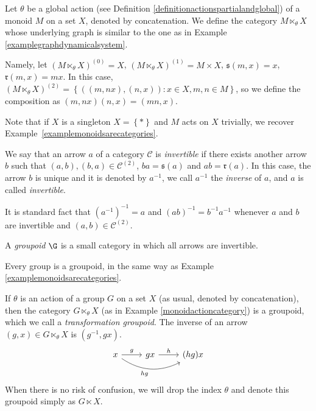 \begin{example}\label{monoidactioncategory}
Let $\theta$ be a global action (see Definition \ref{definitionactionspartialandglobal}) of a monoid $M$ on a set $X$, denoted by concatenation. We define the category $M\ltimes_\theta X$ whose underlying graph is similar to the one as in Example \ref{examplegraphdynamicalsystem}.

Namely, let $(M\ltimes_\theta X)^{(0)}=X$, $(M\ltimes_\theta X)^{(1)}=M\times X$, $\mathfrak{s}(m,x)=x$, $\mathfrak{r}(m,x)=mx$. In this case, $(M\ltimes_\theta X)^{(2)}=\left\{((m,nx),(n,x)):x\in X,m,n\in M\right\}$, so we define the composition as $(m,nx)(n,x)=(mn,x)$.

Note that if $X$ is a singleton $X=\left\{*\right\}$ and $M$ acts on $X$ trivially, we recover Example~\ref{examplemonoidsarecategories}.
\end{example}

We say that an arrow $a$ of a category $\mathcal{C}$ is \emph{invertible} if there exists another arrow $b$ such that $(a,b),(b,a)\in \mathcal{C}^{(2)}$, $ba=\mathfrak{s}(a)$ and $ab=\mathfrak{r}(a)$. In this case, the arrow $b$ is unique and it is denoted by $a^{-1}$, we call $a^{-1}$ the \emph{inverse} of $a$, and $a$ is called \emph{invertible}.

It is standard fact that $(a^{-1})^{-1}=a$ and $(ab)^{-1}=b^{-1}a^{-1}$ whenever $a$ and $b$ are invertible and $(a,b)\in\mathcal{C}^{(2)}$.

\begin{definition}[\cite{MR1724106}]
A \emph{groupoid} $\G$ is a small category in which all arrows are invertible.
\end{definition}

\begin{example}
Every group is a groupoid, in the same way as Example \ref{examplemonoidsarecategories}.
\end{example}

\begin{example}\label{exampletransformationgroupoid}
If $\theta$ is an action of a group $G$ on a set $X$ (as usual, denoted by concatenation), then the category $G\ltimes_\theta X$ (as in Example \ref{monoidactioncategory}) is a groupoid, which we call a \emph{transformation groupoid}. The inverse of an arrow $(g,x)\in G\ltimes_\theta X$ is $(g^{-1},gx)$.
\[\begin{tikzcd}[row sep=tiny]
x\arrow[r,"g"]\arrow[rr,bend right,"hg",swap]&g x\arrow[r,"h"]&(hg)x
\end{tikzcd}\]
When there is no risk of confusion, we will drop the index $\theta$ and denote this groupoid simply as $G\ltimes X$.
\end{example}


